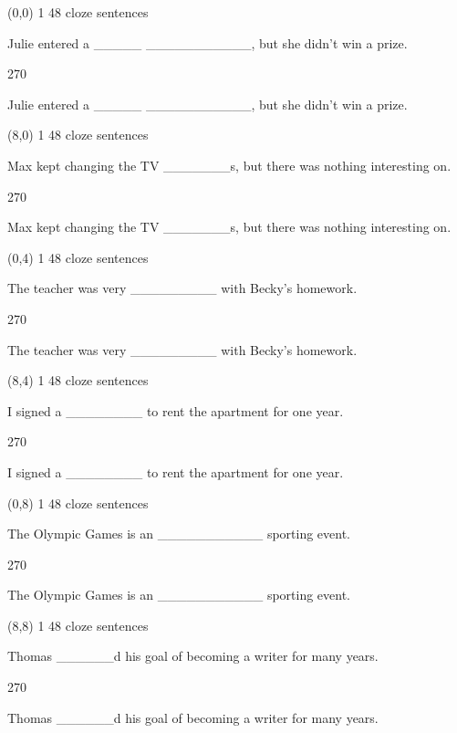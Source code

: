 \documentclass[a4paper]{article}
\newenvironment{itemize*}%
{\begin{itemize}%
 \setlength{\itemsep}{0.5cm}%
 \setlength{\parsep}{0pt}%
 \setlength{\parskip}{0pt}}%
{\end{itemize}}
\newcommand{\mycard}[3]{%
	\small #1 #2
	\par
	\parbox[t][6.8cm][c]{9.5cm}{%
	\par
	\myleft{#3}
	\par
	\myright{#3}
	}
}
\newcommand{\myleft}[1]{%
	\begin{sideways}
	\hspace*{-0.9cm}
		\parbox[t][2.7cm][t]{6.5cm}{%
		\large #1
		}
	\end{sideways}
}
\newcommand{\myright}[1]{%
	\hspace*{6.5cm}
	\begin{turn}{270}
	\hspace*{-7.1cm}
		\parbox[t][2.7cm][t]{6.5cm}{%
		\large #1
		}
	\end{turn}
}
\begin{document}
\null
\newpage

\begin{textblock}{8}(0,0)
\mycard{1}{48 cloze sentences}{
\begin{itemize*}
\item Julie entered a \_\_\_\_\_ \_\_\_\_\_\_\_\_\_\_\_, but she didn't win a prize.
\end{itemize*}
}
\end{textblock}

\begin{textblock}{8}(8,0)
\mycard{1}{48 cloze sentences}{
\begin{itemize*}
\item Max kept changing the TV \_\_\_\_\_\_\_s, but there was nothing interesting on.
\end{itemize*}
}
\end{textblock}

\begin{textblock}{8}(0,4)
\mycard{1}{48 cloze sentences}{
\begin{itemize*}
\item The teacher was very \_\_\_\_\_\_\_\_\_ with Becky's homework. 
\end{itemize*}
}
\end{textblock}

\begin{textblock}{8}(8,4)
\mycard{1}{48 cloze sentences}{
\begin{itemize*}
\item I signed a \_\_\_\_\_\_\_\_ to rent the apartment for one year. 
\end{itemize*}
}
\end{textblock}

\begin{textblock}{8}(0,8)
\mycard{1}{48 cloze sentences}{
\begin{itemize*}
\item The Olympic Games is an \_\_\_\_\_\_\_\_\_\_\_ sporting event.
\end{itemize*}
}
\end{textblock}

\begin{textblock}{8}(8,8)
\mycard{1}{48 cloze sentences}{
\begin{itemize*}
\item Thomas \_\_\_\_\_\_d his goal of becoming a writer for many years.
\end{itemize*}
}
\end{textblock}
\end{document}
